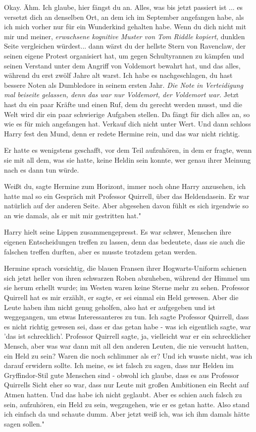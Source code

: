 \glqq{}Okay. Ähm. Ich glaube, hier fängst du an. Alles, was bis jetzt passiert
ist ... es versetzt dich an denselben Ort, an dem ich im September angefangen
habe, als ich mich vorher nur für ein Wunderkind gehalten habe. Wenn du dich
nicht mit mir und meiner\grqq{},\emph{ erwachsene kognitive Muster von Tom
Riddle kopiert,} \glqq{}dunklen Seite vergleichen würdest... dann wärst du der
hellste Stern von Ravenclaw, der seinen eigene Protest organisiert hat, um gegen
Schultyrannen zu kämpfen und seinen Verstand unter dem Angriff von Voldemort
bewahrt hat, und das alles, während du erst zwölf Jahre alt warst. Ich habe es
nachgeschlagen, du hast bessere Noten als Dumbledore in seinem ersten
Jahr.\grqq{} \emph{Die Note in Verteidigung mal beiseite gelassen, denn das war
nur Voldemort, der Voldemort war.} \glqq{}Jetzt hast du ein paar Kräfte und einen
Ruf, dem du gerecht werden musst, und die Welt wird dir ein paar schwierige
Aufgaben stellen. Da fängt für dich alles an, so wie es für mich angefangen hat.
Verkauf dich nicht unter Wert.\grqq{} Und dann schloss Harry fest den Mund, denn
er redete Hermine rein, und das war nicht richtig.

Er hatte es wenigstens geschafft, vor dem Teil aufzuhören, in dem er fragte,
wenn sie mit all dem, was sie hatte, keine Heldin sein konnte, wer genau ihrer
Meinung nach es dann tun würde.

\glqq{}Weißt du\grqq{}, sagte Hermine zum Horizont, immer noch ohne Harry
anzusehen, \glqq{}ich hatte mal so ein Gespräch mit Professor Quirrell, über das
Heldendasein. Er war natürlich auf der anderen Seite. Aber abgesehen davon fühlt
es sich irgendwie so an wie damals, als er mit mir gestritten hat."

Harry hielt seine Lippen zusammengepresst. Es war schwer, Menschen ihre eigenen
Entscheidungen treffen zu lassen, denn das bedeutete, dass sie auch die falschen
treffen durften, aber es musste trotzdem getan werden.

Hermine sprach vorsichtig, die blauen Fransen ihrer Hogwarts-Uniform schienen
sich jetzt heller von ihren schwarzen Roben abzuheben, während der Himmel um sie
herum erhellt wurde; im Westen waren keine Sterne mehr zu sehen. \glqq{}Professor
Quirrell hat es mir erzählt, er sagte, er sei einmal ein Held gewesen. Aber die
Leute haben ihm nicht genug geholfen, also hat er aufgegeben und ist
weggegangen, um etwas Interessanteres zu tun. Ich sagte Professor Quirrell, dass
es nicht richtig gewesen sei, dass er das getan habe - was ich eigentlich sagte,
war 'das ist schrecklich'. Professor Quirrell sagte, ja, vielleicht war er ein
schrecklicher Mensch, aber was war dann mit all den anderen Leuten, die nie
versucht hatten, ein Held zu sein? Waren die noch schlimmer als er? Und ich
wusste nicht, was ich darauf erwidern sollte. Ich meine, es ist falsch zu sagen,
dass nur Helden im Gryffindor-Stil gute Menschen sind - obwohl ich glaube, dass
es aus Professor Quirrells Sicht eher so war, dass nur Leute mit großen
Ambitionen ein Recht auf Atmen hatten. Und das habe ich nicht geglaubt. Aber es
schien auch falsch zu sein, aufzuhören, ein Held zu sein, wegzugehen, wie er es
getan hatte. Also stand ich einfach da und schaute dumm. Aber jetzt weiß ich,
was ich ihm damals hätte sagen sollen."

